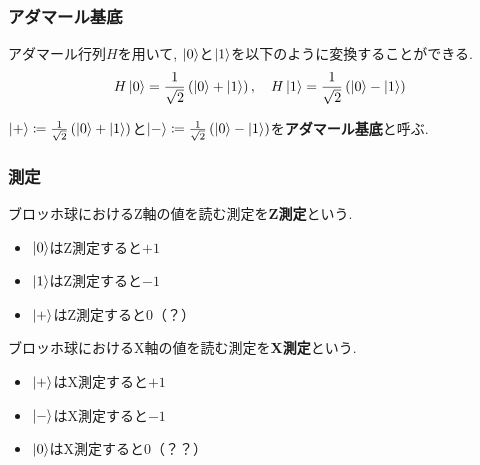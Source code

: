 \documentclass[9pt]{beamer}
\begin{document}
\begin{frame}
  \frametitle{アダマール基底}
  アダマール行列$H$を用いて, $\ket{0}$と$\ket{1}$を以下のように変換することができる.
  \begin{align}
    H \ket{0} = \frac{1}{\sqrt{2}} \left( \ket{0} + \ket{1} \right), \quad
    H \ket{1} = \frac{1}{\sqrt{2}} \left( \ket{0} - \ket{1} \right)
  \end{align}
  \begin{center}
    
    \hspace{1.2cm}
    
  \end{center}
  $\ket{+} \coloneq \frac{1}{\sqrt{2}} \left( \ket{0} + \ket{1} \right)$と$\ket{-} \coloneq \frac{1}{\sqrt{2}} \left( \ket{0} - \ket{1} \right)$を\textbf{アダマール基底}と呼ぶ.
\end{frame}

\begin{frame}
  \frametitle{測定}
  ブロッホ球におけるZ軸の値を読む測定を\textbf{Z測定}という.
  \begin{itemize}
    \item $\ket{0}$はZ測定すると$+1$
    \item $\ket{1}$はZ測定すると$-1$
    \item $\ket{+}$はZ測定すると$0$（？）
  \end{itemize}
  ブロッホ球におけるX軸の値を読む測定を\textbf{X測定}という.
  \begin{itemize}
    \item $\ket{+}$はX測定すると$+1$
    \item $\ket{-}$はX測定すると$-1$
    \item $\ket{0}$はX測定すると$0$（？？）
  \end{itemize}
\end{frame}
\end{document}
